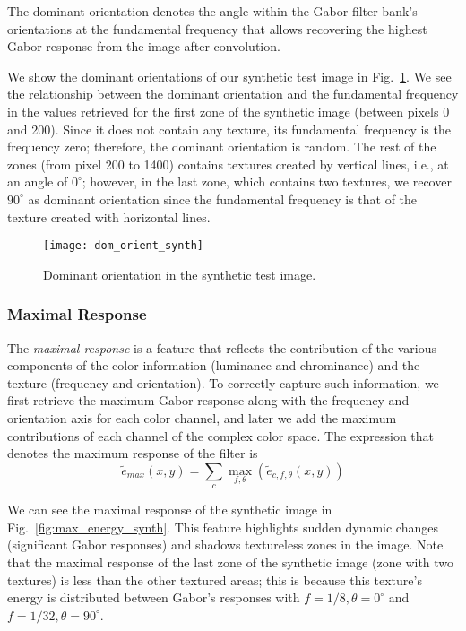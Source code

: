 The dominant orientation denotes the angle within the Gabor filter bank's orientations at the fundamental frequency that allows recovering the highest Gabor response from the image after convolution.

We show the dominant orientations of our synthetic test image in Fig.\ \ref{fig:dom_orient_synth}. We see the relationship between the dominant orientation and the fundamental frequency in the values retrieved for the first zone of the synthetic image (between pixels 0 and 200). Since it does not contain any texture, its fundamental frequency is the frequency zero; therefore, the dominant orientation is random. The rest of the zones (from pixel 200 to 1400) contains textures created by vertical lines, i.e., at an angle of $0^\circ$; however, in the last zone, which contains two textures, we recover $90^\circ$ as dominant orientation since the fundamental frequency is that of the texture created with horizontal lines. 

\begin{figure}[!ht]
	\texttt{[image: dom\_orient\_synth]}
    \caption{Dominant orientation in the synthetic test image.}
    \label{fig:dom_orient_synth}
\end{figure}

\subsubsection{Maximal Response}
The \textit{maximal response} is a feature that reflects the contribution of the various components of the color information (luminance and chrominance) and the texture (frequency and orientation). To correctly capture such information, we first retrieve the maximum Gabor response along with the frequency and orientation axis for each color channel, and later we add the maximum contributions of each channel of the complex color space. The expression that denotes the maximum response of the filter is
\begin{equation}
	\widetilde{e}_{max}(x,y) = \underset{c}{\sum} \underset{f, \theta}{\max} \left(\widetilde{e}_{c, f, \theta}(x,y)\right) \label{eq:max_energy}
\end{equation}

We can see the maximal response of the synthetic image in Fig.\ \ref{fig:max_energy_synth}. This feature highlights sudden dynamic changes (significant Gabor responses) and shadows textureless zones in the image. Note that the maximal response of the last zone of the synthetic image (zone with two textures) is less than the other textured areas; this is because this texture's energy is distributed between Gabor's responses with $f=1/8, \theta=0^\circ$ and $f=1/32, \theta=90^\circ$.

